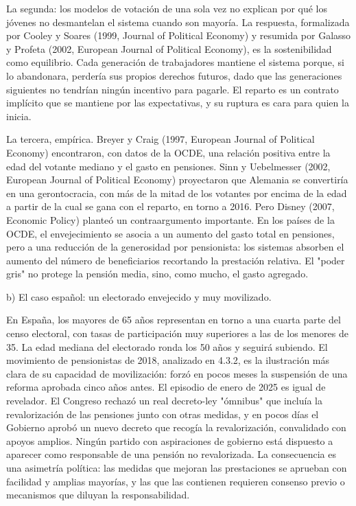 \documentclass[10pt,a4paper]{article}
\begin{document}
La segunda: los modelos de votación de una sola vez no explican por qué los jóvenes no desmantelan el sistema cuando son mayoría. La respuesta, formalizada por Cooley y Soares (1999, Journal of Political Economy) y resumida por Galasso y Profeta (2002, European Journal of Political Economy), es la sostenibilidad como equilibrio. Cada generación de trabajadores mantiene el sistema porque, si lo abandonara, perdería sus propios derechos futuros, dado que las generaciones siguientes no tendrían ningún incentivo para pagarle. El reparto es un contrato implícito que se mantiene por las expectativas, y su ruptura es cara para quien la inicia.

La tercera, empírica. Breyer y Craig (1997, European Journal of Political Economy) encontraron, con datos de la OCDE, una relación positiva entre la edad del votante mediano y el gasto en pensiones. Sinn y Uebelmesser (2002, European Journal of Political Economy) proyectaron que Alemania se convertiría en una gerontocracia, con más de la mitad de los votantes por encima de la edad a partir de la cual se gana con el reparto, en torno a 2016. Pero Disney (2007, Economic Policy) planteó un contraargumento importante. En los países de la OCDE, el envejecimiento se asocia a un aumento del gasto total en pensiones, pero a una reducción de la generosidad por pensionista: los sistemas absorben el aumento del número de beneficiarios recortando la prestación relativa. El "poder gris" no protege la pensión media, sino, como mucho, el gasto agregado.

b) El caso español: un electorado envejecido y muy movilizado.

En España, los mayores de 65 años representan en torno a una cuarta parte del censo electoral, con tasas de participación muy superiores a las de los menores de 35. La edad mediana del electorado ronda los 50 años y seguirá subiendo. El movimiento de pensionistas de 2018, analizado en 4.3.2, es la ilustración más clara de su capacidad de movilización: forzó en pocos meses la suspensión de una reforma aprobada cinco años antes. El episodio de enero de 2025 es igual de revelador. El Congreso rechazó un real decreto-ley "ómnibus" que incluía la revalorización de las pensiones junto con otras medidas, y en pocos días el Gobierno aprobó un nuevo decreto que recogía la revalorización, convalidado con apoyos amplios. Ningún partido con aspiraciones de gobierno está dispuesto a aparecer como responsable de una pensión no revalorizada. La consecuencia es una asimetría política: las medidas que mejoran las prestaciones se aprueban con facilidad y amplias mayorías, y las que las contienen requieren consenso previo o mecanismos que diluyan la responsabilidad.
\end{document}
